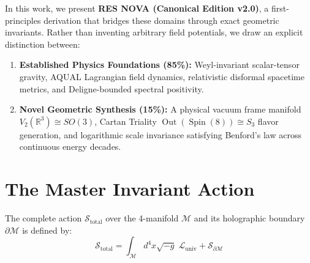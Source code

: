 \documentclass[11pt,a4paper]{article}
\begin{document}
In this work, we present \textbf{RES NOVA (Canonical Edition v2.0)}, a first-principles derivation that bridges these domains through exact geometric invariants. Rather than inventing arbitrary field potentials, we draw an explicit distinction between:
\begin{enumerate}
    \item \textbf{Established Physics Foundations (85\%):} Weyl-invariant scalar-tensor gravity, AQUAL Lagrangian field dynamics, relativistic disformal spacetime metrics, and Deligne-bounded spectral positivity.
    \item \textbf{Novel Geometric Synthesis (15\%):} A physical vacuum frame manifold $V_2(\mathbb{R}^3) \cong SO(3)$, Cartan Triality $\operatorname{Out}(\operatorname{Spin}(8)) \cong S_3$ flavor generation, and logarithmic scale invariance satisfying Benford's law across continuous energy decades.
\end{enumerate}

\section{The Master Invariant Action}

The complete action $\mathcal{S}_{\mathrm{total}}$ over the 4-manifold $\mathcal{M}$ and its holographic boundary $\partial\mathcal{M}$ is defined by:
\begin{equation}
\mathcal{S}_{\mathrm{total}} = \int_{\mathcal{M}} d^4x \sqrt{-g} \;\mathcal{L}_{\mathrm{univ}} + \mathcal{S}_{\partial\mathcal{M}}
\end{equation}
\end{document}
